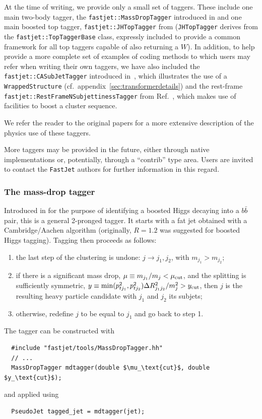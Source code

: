 \documentclass[12pt,a4]{article}
\newcommand{\fastjet}{\texttt{FastJet}\xspace}
\newcommand{\ttt}[1]{{\small\texttt{#1}}}
\begin{document}
At the time of writing, we provide only a small set of taggers.
%
These include one main two-body tagger, the
\ttt{fastjet::MassDropTagger} introduced in \cite{BDRS} and one main
boosted top tagger, \ttt{fastjet::JHTopTagger} from
\cite{Kaplan:2008ie} (\ttt{JHTopTagger} derives from the
\ttt{fastjet::TopTaggerBase} class, expressly included to provide a
common framework for all top taggers capable of also returning a $W$).
%
In addition, to help provide a more complete set of examples of coding
methods to which users may refer when writing their own taggers, we
have also included the
%
\ttt{fastjet::CASubJetTagger} introduced in~\cite{Butterworth:2009qa},
which illustrates the use of a \ttt{WrappedStructure} (cf.\
appendix~\ref{sec:transformerdetails}) and the
rest-frame \ttt{fastjet::RestFrameNSubjettinessTagger}
from Ref.~\cite{nsubtagger}, which makes use of facilities to boost a
cluster sequence.


We refer the reader to the original papers for a more extensive
description of the physics use of these taggers.

More taggers may be provided in the future, either through native
implementations or, potentially, through a ``contrib'' type area.
%
Users are invited to contact the \fastjet authors for further
information in this regard.

\subsubsection{The mass-drop tagger}

Introduced in \cite{BDRS} for the purpose of identifying a boosted Higgs
decaying into a $b\bar b$ pair, this is a general 2-pronged tagger. It starts with a fat jet obtained
with a Cambridge/Aachen algorithm (originally, $R=1.2$ was suggested
for boosted Higgs tagging). Tagging then proceeds as follows:
\begin{enumerate}
\item the last step of the clustering is undone: $j \to j_1,j_2$, with
  $m_{j_1} > m_{j_2}$;
\item if there is a significant mass drop, $\mu \equiv m_{j_1}/m_j <
  \mu_{\rm cut}$, and the splitting is sufficiently symmetric,
  $y\equiv {\rm min}(p_{tj_1}^2, p_{tj_2}^2)\Delta R_{j_1j_2}^2/m_j^2
  > y_{\rm cut}$, then $j$ is the resulting heavy particle candidate
  with $j_1$ and $j_2$ its subjets;
\item otherwise, redefine $j$ to be equal to $j_1$ and go back to step
  1.
\end{enumerate}
%
The tagger can be constructed with
\begin{lstlisting}
  #include "fastjet/tools/MassDropTagger.hh"
  // ...
  MassDropTagger mdtagger(double $\mu_\text{cut}$, double $y_\text{cut}$);
\end{lstlisting}
and applied using
\begin{lstlisting}
  PseudoJet tagged_jet = mdtagger(jet);
\end{lstlisting}
\end{document}
